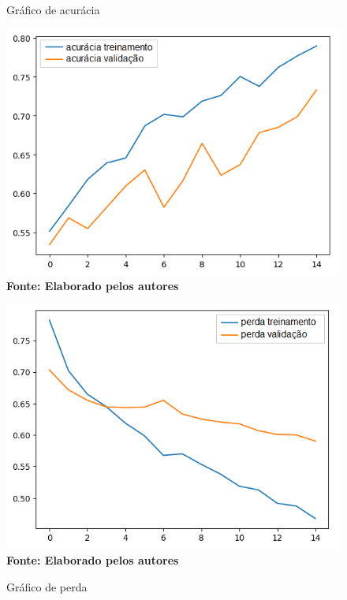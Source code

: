 \begin{figure}[ht]
\centering
\begin{minipage}{0.45\textwidth}
  \centering
  \caption[\hspace{0.1cm}Grade Computacional.]{Gráfico de acurácia}
  \vspace{-0.4cm}
  \includegraphics[width=\linewidth]{figuras/accuracy.png}
  \captionsetup{justification=centering}
  \vspace{-0.2cm}
  \\\textbf{\footnotesize Fonte: Elaborado pelos autores}
  \label{fig:acc}
\end{minipage}\hfill
\begin{minipage}{0.45\textwidth}
  \centering
  \caption[\hspace{0.1cm}Grade Computacional.]{Gráfico de perda}
  \vspace{-0.4cm}
  \includegraphics[width=\linewidth]{figuras/loss.png}
  \captionsetup{justification=centering}
  \vspace{-0.2cm}
  \\\textbf{\footnotesize Fonte: Elaborado pelos autores}
  \label{fig:loss}
\end{minipage}
\end{figure}

